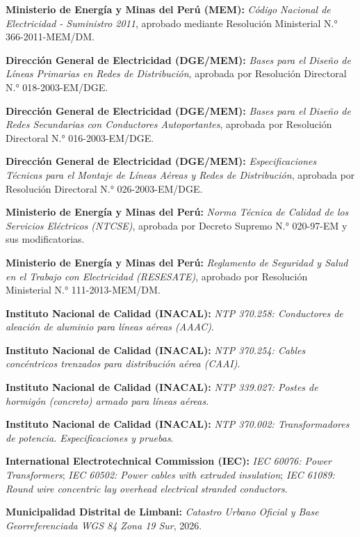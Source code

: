\begin{enumerate}[label={[\arabic*]}]
  \item \textbf{Ministerio de Energía y Minas del Perú (MEM):} \textit{Código Nacional de Electricidad - Suministro 2011}, aprobado mediante Resolución Ministerial N.° 366-2011-MEM/DM.
  \item \textbf{Dirección General de Electricidad (DGE/MEM):} \textit{Bases para el Diseño de Líneas Primarias en Redes de Distribución}, aprobada por Resolución Directoral N.° 018-2003-EM/DGE.
  \item \textbf{Dirección General de Electricidad (DGE/MEM):} \textit{Bases para el Diseño de Redes Secundarias con Conductores Autoportantes}, aprobada por Resolución Directoral N.° 016-2003-EM/DGE.
  \item \textbf{Dirección General de Electricidad (DGE/MEM):} \textit{Especificaciones Técnicas para el Montaje de Líneas Aéreas y Redes de Distribución}, aprobada por Resolución Directoral N.° 026-2003-EM/DGE.
  \item \textbf{Ministerio de Energía y Minas del Perú:} \textit{Norma Técnica de Calidad de los Servicios Eléctricos (NTCSE)}, aprobada por Decreto Supremo N.° 020-97-EM y sus modificatorias.
  \item \textbf{Ministerio de Energía y Minas del Perú:} \textit{Reglamento de Seguridad y Salud en el Trabajo con Electricidad (RESESATE)}, aprobado por Resolución Ministerial N.° 111-2013-MEM/DM.
  \item \textbf{Instituto Nacional de Calidad (INACAL):} \textit{NTP 370.258: Conductores de aleación de aluminio para líneas aéreas (AAAC)}.
  \item \textbf{Instituto Nacional de Calidad (INACAL):} \textit{NTP 370.254: Cables concéntricos trenzados para distribución aérea (CAAI)}.
  \item \textbf{Instituto Nacional de Calidad (INACAL):} \textit{NTP 339.027: Postes de hormigón (concreto) armado para líneas aéreas}.
  \item \textbf{Instituto Nacional de Calidad (INACAL):} \textit{NTP 370.002: Transformadores de potencia. Especificaciones y pruebas}.
  \item \textbf{International Electrotechnical Commission (IEC):} \textit{IEC 60076: Power Transformers}; \textit{IEC 60502: Power cables with extruded insulation}; \textit{IEC 61089: Round wire concentric lay overhead electrical stranded conductors}.
  \item \textbf{Municipalidad Distrital de Limbani:} \textit{Catastro Urbano Oficial y Base Georreferenciada WGS 84 Zona 19 Sur}, 2026.
\end{enumerate}

